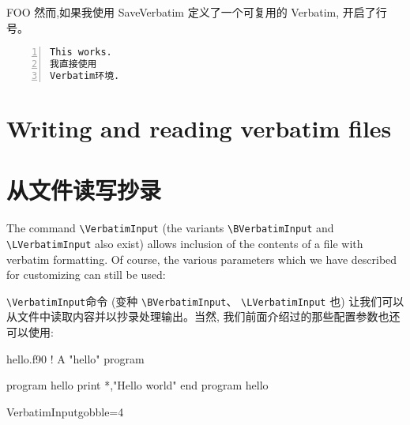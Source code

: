 \documentclass[twoside]{article}
\newcommand\cs[1]{\texttt{\textbackslash#1}}
\newcommand\verbatimTxt{抄录}
\begin{document}
\begin{SideBySideExample}
\begin{SaveVerbatim}{FOO}
然而,如果我使用
SaveVerbatim
定义了一个可复用的
Verbatim,
开启了行号。
\end{SaveVerbatim}

\begin{Verbatim}[numbers=left]
This works.
我直接使用
Verbatim环境.
\end{Verbatim}

\end{SideBySideExample}


\clearpage

\section{Writing and reading verbatim files}
\section{从文件读写抄录}
\label{sec:VerbatimInclude}


  The command \cs{VerbatimInput} (the variants \cs{BVerbatimInput} and
\cs{LVerbatimInput} also exist) allows inclusion of the contents of a file
with verbatim formatting. Of course, the various parameters which we have
described for customizing can still be used:

  \cs{VerbatimInput}命令 (变种 \cs{BVerbatimInput}、
\cs{LVerbatimInput} 也) 让我们可以从文件中读取内容并以{\verbatimTxt}处理输出。当然, 我们前面介绍过的那些配置参数也还可以使用:

%The file we will use for \VerbatimInput

\typeout{*************************************}
\typeout{*************************************}

\begin{VerbatimOut}{hello.f90}
  ! A "hello" program

  program hello
    print *,"Hello world"
  end program hello
\end{VerbatimOut}

\begin{SideBySideExample}
  \RecustomVerbatimCommand{\VerbatimInput}
  {VerbatimInput}{gobble=4}



\end{SideBySideExample}
\end{document}
